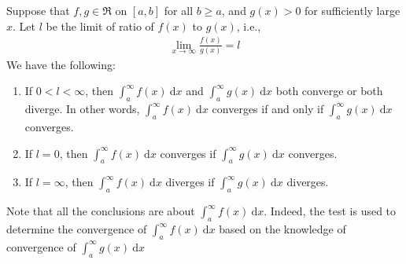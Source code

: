\documentclass[thmcnt=section, 12pt]{elegantbook}
\begin{document}
\begin{theorem}
    Suppose that $f, g \in \mathfrak{R}$ on $[a, b]$ for all $b \geq a$, and $g(x) > 0$ for sufficiently large $x$. Let $l$ be the limit of ratio of $f(x)$ to $g(x)$, i.e., 
    \begin{align*}
        \lim_{x \to \infty} \frac{f(x)}{g(x)} = l
    \end{align*}
    We have the following:
    \begin{enumerate}
        \item If $0 < l < \infty$, then $\int_a^\infty f(x) \ \mathrm{d}x$ and $\int_a^\infty g(x) \ \mathrm{d}x$ both converge or both diverge. In other words, $\int_a^\infty f(x) \ \mathrm{d}x$ converges if and only if $\int_a^\infty g(x) \ \mathrm{d}x$ converges.
        \item If $l = 0$, then $\int_a^\infty f(x) \ \mathrm{d}x$ converges if $\int_a^\infty g(x) \ \mathrm{d}x$ converges.
        \item If $l = \infty$, then $\int_a^\infty f(x) \ \mathrm{d}x$ diverges if $\int_a^\infty g(x) \ \mathrm{d}x$ diverges.
    \end{enumerate}
\end{theorem}

\begin{remark}
    Note that all the conclusions are about $\int_a^\infty f(x) \ \mathrm{d}x$. Indeed, the test is used to determine the convergence of $\int_a^\infty f(x) \ \mathrm{d}x$ based on the knowledge of convergence of $\int_a^\infty g(x) \ \mathrm{d}x$
\end{remark}
\end{document}
